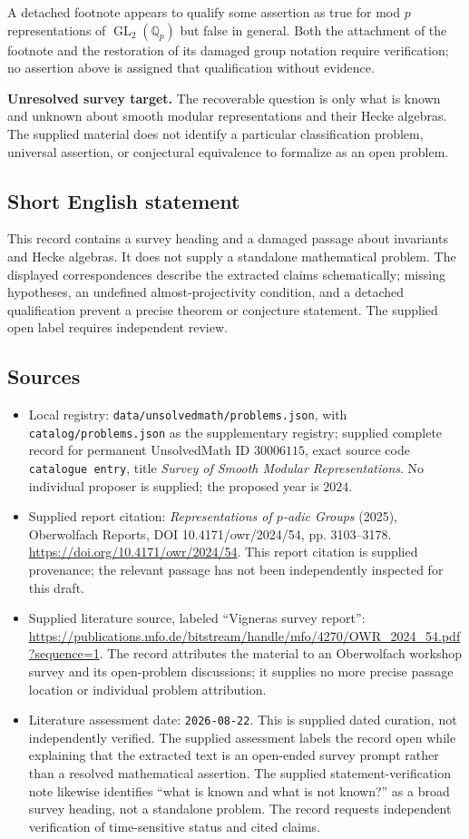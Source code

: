 \documentclass[11pt]{article}
\begin{document}
A detached footnote appears to qualify some assertion as true for mod \(p\) representations of \(\operatorname{GL}_2(\mathbb Q_p)\) but false in general. Both the attachment of the footnote and the restoration of its damaged group notation require verification; no assertion above is assigned that qualification without evidence.

\textbf{Unresolved survey target.} The recoverable question is only what is known and unknown about smooth modular representations and their Hecke algebras. The supplied material does not identify a particular classification problem, universal assertion, or conjectural equivalence to formalize as an open problem.
\subsection{Short English statement}
This record contains a survey heading and a damaged passage about invariants and Hecke algebras. It does not supply a standalone mathematical problem. The displayed correspondences describe the extracted claims schematically; missing hypotheses, an undefined almost-projectivity condition, and a detached qualification prevent a precise theorem or conjecture statement. The supplied open label requires independent review.
\subsection{Sources}
\begin{itemize}
\item Local registry: \texttt{data/unsolvedmath/problems.json}, with \texttt{catalog/problems.json} as the supplementary registry; supplied complete record for permanent UnsolvedMath ID \(30006115\), exact source code \texttt{catalogue entry}, title \emph{Survey of Smooth Modular Representations}. No individual proposer is supplied; the proposed year is \(2024\).
\item Supplied report citation: \emph{Representations of \(p\)-adic Groups} (2025), Oberwolfach Reports, DOI 10.4171/owr/2024/54, pp. 3103--3178. \url{https://doi.org/10.4171/owr/2024/54}. This report citation is supplied provenance; the relevant passage has not been independently inspected for this draft.
\item Supplied literature source, labeled ``Vigneras survey report'': \url{https://publications.mfo.de/bitstream/handle/mfo/4270/OWR_2024_54.pdf?sequence=1}. The record attributes the material to an Oberwolfach workshop survey and its open-problem discussions; it supplies no more precise passage location or individual problem attribution.
\item Literature assessment date: \texttt{2026-08-22}. This is supplied dated curation, not independently verified. The supplied assessment labels the record open while explaining that the extracted text is an open-ended survey prompt rather than a resolved mathematical assertion. The supplied statement-verification note likewise identifies ``what is known and what is not known?'' as a broad survey heading, not a standalone problem. The record requests independent verification of time-sensitive status and cited claims.
\end{itemize}
\end{document}

